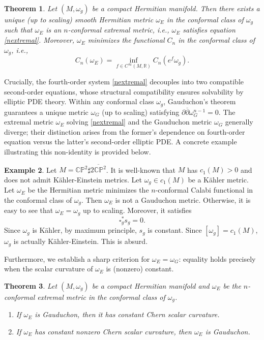 \documentclass[12pt]{amsart}
\newcommand\bp{{\bar\partial}}
\theoremstyle{plain}
\newtheorem{thm}{Theorem}[section]
\theoremstyle{definition}
\newtheorem{example}[thm]{Example}
\newcommand{\btheorem}{\begin{thm}}
\newcommand{\etheorem}{\end{thm}}
\newcommand{\p}{\partial}
\renewcommand{\bar}{\overline}
\newcommand{\beq}{\begin{equation}}
\newcommand{\eeq}{\end{equation}}
\newcommand{\bd}{\begin{enumerate}}
\newcommand{\ed}{\end{enumerate}}
\renewcommand{\bp}{\bar{\partial}}
\renewcommand{\>}{\rightarrow}
\newcommand{\C}{{\mathbb C}}
\renewcommand{\P}{{\mathbb P}}
\newcommand{\R}{{\mathbb R}}
\renewcommand{\#}{\sharp}
\numberwithin{equation}{section} %
\begin{document}
    \begin{thm}\label{thm2}
        Let $(M,\omega_g)$ be a compact Hermitian manifold. Then there exists a unique (up to scaling) smooth Hermitian metric $\omega_E$ in the conformal class of $\omega_g$ such that $\omega_E$ is an $n$-conformal extremal metric, i.e., $\omega_E$ satisfies equation \eqref{nextremal}. Moreover, $\omega_E$ minimizes the functional $C_n$ in the conformal class of $\omega_g$, i.e.,
        \beq C_n(\omega_E)=\inf_{f\in C^\infty(M,\R)}C_n(e^f \omega_g). \eeq
            \end{thm}

        \noindent       Crucially, the fourth-order system \eqref{nextremal} decouples into two compatible second-order equations, whose structural compatibility ensures solvability by elliptic PDE theory.  Within any conformal class
        $\omega_g$, Gauduchon's theorem guarantees a unique metric $\omega_G$ (up to scaling) satisfying $\p\bp\omega_G^{n-1}=0$.  The extremal metric
        $\omega_E$
        solving \eqref{nextremal} and the Gauduchon metric $\omega_G$
        generally diverge; their distinction arises from the former's dependence on fourth-order equation versus the latter's second-order elliptic PDE. A concrete example illustrating this non-identity is provided below.




\begin{example} Let $M=\C\P^2\#\bar{2\C\P^2}$. It is well-known that $M$ has $c_1(M)>0$ and does not admit K\"ahler-Einstein metrics.  Let $\omega_g\in c_1(M)$ be a K\"ahler metric.  Let $\omega_E$ be the Hermitian metric minimizes the $n$-conformal Calabi functional in the conformal class of $\omega_g$. Then $\omega_E$ is not a Gauduchon metric. Otherwise, it is easy to see that $\omega_E=\omega_g$ up to scaling. Moreover, it satisfies
    \beq \square_g^*s_g=0.\eeq
    Since $\omega_g$ is K\"ahler, by maximum principle, $s_g$ is constant. Since $[\omega_g]=c_1(M)$, $\omega_g$ is actually K\"ahler-Einstein. This is absurd.
\end{example}


\noindent
Furthermore, we establish a sharp criterion for
 $\omega_E=\omega_G$: equality holds precisely when the scalar curvature of
$\omega_E$ is (nonzero) constant.

\btheorem\label{thm3} Let $(M,\omega_g)$ be a compact Hermitian manifold and $\omega_E$ be the $n$-conformal extremal metric in the conformal class of $\omega_g$.
\bd \item If  $\omega_E$ is Gauduchon, then it has constant Chern scalar curvature.
\item If  $\omega_E$ has constant nonzero Chern scalar curvature, then $\omega_E$ is Gauduchon.
\ed
\etheorem
\end{document}

